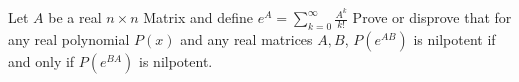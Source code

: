 Let $A$ be a real $n\times n$ Matrix and define $e^{A}=\sum_{k=0}^{\infty} \frac{A^{k}}{k!}$
Prove or disprove that for any real polynomial $P(x)$ and any real matrices $A,B$,
$P(e^{AB})$ is nilpotent if and only if $P(e^{BA})$ is nilpotent.